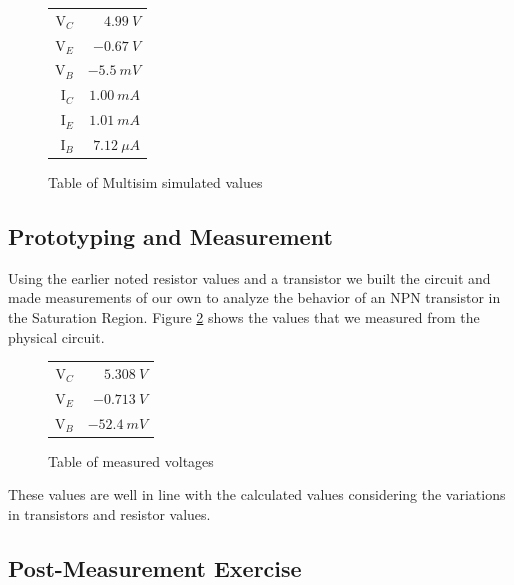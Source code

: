 \documentclass{article}
\begin{document}
\begin{figure}
  \begin{center}
    \begin{tabular}{r|r}
      V$_C$ & $\SI{4.99}{V}$ \\
      V$_E$ & $\SI{-0.67}{V}$ \\
      V$_B$ & $\SI{-5.5}{mV}$ \\
      I$_C$ & $\SI{1.00}{mA}$ \\
      I$_E$ & $\SI{1.01}{mA}$ \\
      I$_B$ & $\SI{7.12}{\mu A}$ \\

    \end{tabular}
  \end{center}
  \caption{Table of Multisim simulated values}
  \label{table:satTableSim}
\end{figure}

\subsection{Prototyping and Measurement}

Using the earlier noted resistor values and a transistor
we built the circuit and made measurements of our own
to analyze the behavior of an NPN transistor in the
Saturation Region. Figure \ref{table:satTableMeas} shows
the values that we measured from the physical circuit.

\begin{figure}[h!]
  \begin{center}
    \begin{tabular}{r|r}
      V$_C$ & $\SI{5.308}{V}$ \\
      V$_E$ & $\SI{-0.713}{V}$ \\
      V$_B$ & $\SI{-52.4}{mV}$ \\

    \end{tabular}
  \end{center}
  \caption{Table of measured voltages}
  \label{table:satTableMeas}
\end{figure}

These values are well in line with the calculated values
considering the variations in transistors and resistor
values.

\subsection{Post-Measurement Exercise}
\end{document}
